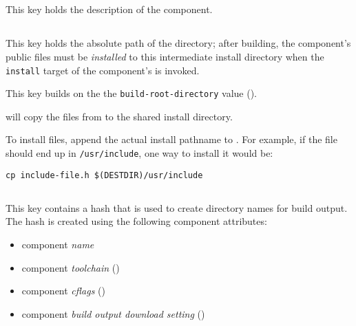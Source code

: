 
\subsection{}\label{variables:description}

This key holds the description of the component.


\subsection{}\label{variables:destdir-directory}

This key holds the absolute path of the \destdir directory; after
building, the component's public files must be \emph{installed} to this
intermediate install directory when the \texttt{install} target of the
component's \makefile is invoked.

This key builds on the the \texttt{build-root-directory} value
().

\lmsbw will copy the files from \destdir to the shared install directory.

To install files, append the actual install pathname to \destdir.  For
example, if the file should end up in \texttt{/usr/include}, one way
to install it would be:

\begin{verbatim}
cp include-file.h $(DESTDIR)/usr/include
\end{verbatim}


\subsection{}\label{variables:hash}

This key contains a hash that is used to create directory names for
build output.  The hash is created using the following component
attributes:

\begin{itemize}
\item component \emph{name}
\item component \emph{toolchain} ()
\item component \emph{cflags} ()
\item component \emph{build output download setting}
  ()
\end{itemize}

